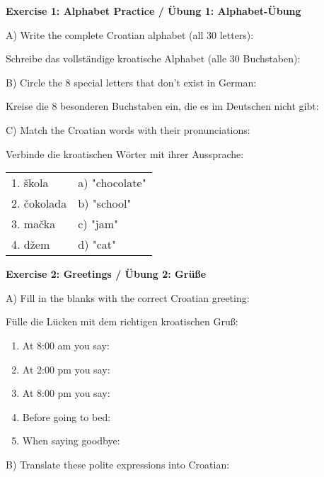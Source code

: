 \begin{exercise}
\textbf{Exercise 1: Alphabet Practice / Übung 1: Alphabet-Übung}

A) Write the complete Croatian alphabet (all 30 letters):

Schreibe das vollständige kroatische Alphabet (alle 30 Buchstaben):

\vspace{2cm}

B) Circle the 8 special letters that don't exist in German:

Kreise die 8 besonderen Buchstaben ein, die es im Deutschen nicht gibt:

\vspace{1cm}

C) Match the Croatian words with their pronunciations:

Verbinde die kroatischen Wörter mit ihrer Aussprache:

\begin{tabular}{ll}
1. škola & a) "chocolate" \\
2. čokolada & b) "school" \\
3. mačka & c) "jam" \\
4. džem & d) "cat" \\
\end{tabular}

\vspace{2cm}

\textbf{Exercise 2: Greetings / Übung 2: Grüße}

A) Fill in the blanks with the correct Croatian greeting:

Fülle die Lücken mit dem richtigen kroatischen Gruß:

\begin{enumerate}
    \item At 8:00 am you say: \underline{\hspace{5cm}}
    \item At 2:00 pm you say: \underline{\hspace{5cm}}
    \item At 8:00 pm you say: \underline{\hspace{5cm}}
    \item Before going to bed: \underline{\hspace{5cm}}
    \item When saying goodbye: \underline{\hspace{5cm}}
\end{enumerate}

B) Translate these polite expressions into Croatian:


\end{exercise}
